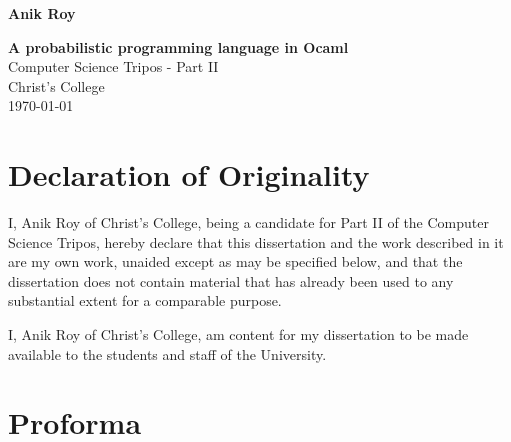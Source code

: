 \documentclass[12pt,notitlepage,a4paper]{report}
\begin{document}





\pagestyle{empty}

\hfill{\LARGE \bf Anik Roy}

\vspace*{60mm}
\begin{center}
	\Huge
	{\bf A probabilistic programming language in Ocaml} \\
	\vspace*{5mm}
	Computer Science Tripos - Part II \\
	\vspace*{5mm}
	Christ's College \\
	\vspace*{5mm}
	\today  %
\end{center}

\cleardoublepage


\setcounter{page}{1}
\pagestyle{plain}

\chapter*{Declaration of Originality}

I, Anik Roy of Christ's College, being a candidate for Part II of the Computer Science Tripos, hereby declare that this dissertation and the work described in it are my own work, unaided except as may be specified below, and that the dissertation does not contain material that has already been used to any substantial extent for a comparable purpose.

I, Anik Roy of Christ's College, am content for my dissertation to be made available to the students and staff of the University. 

\bigskip
{}

\medskip
{}
\clearpage

\chapter*{Proforma}

\newpage

\cleardoublepage

\tableofcontents
\listoffigures
\listoflistings
\end{document}
